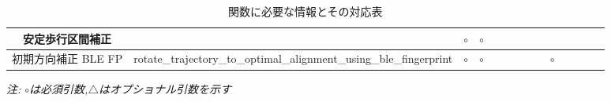 \begin{table*}[ht]
{\begin{tabular}{|c|c|c|c|c|c|c|c|c|c|c|c|c|c|}
			安定歩行区間補正      &                                                                     & \multicolumn{1}{c|}{$\circ$} & \multicolumn{1}{c|}{$\circ$} &                              &                              &                              &                                                                                                               &                              &                           &                                  &    &                              &    \\ \hline
			初期方向補正 BLE FP & rotate\_trajectory\_to\_optimal\_alignment\_using\_ble\_fingerprint
			              & \multicolumn{1}{c|}{$\circ$}                                        & \multicolumn{1}{c|}{$\circ$} &                              &                              &                              &                              &                                                                                                               & \multicolumn{1}{c|}{$\circ$} &                           &                                  &    &                                   \\ \hline
		\end{tabular}
	}
	\caption{関数に必要な情報とその対応表} \label{}
	\textit{注: $\circ$は必須引数,$\triangle$はオプショナル引数を示す} \label{tab:my_label}
\end{table*}










